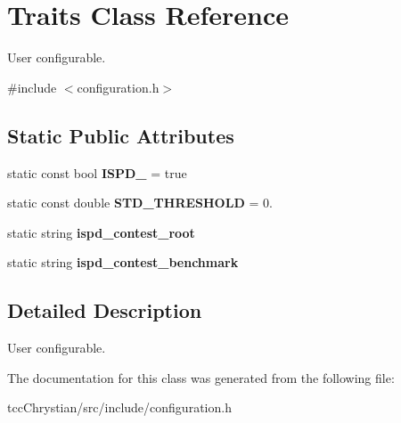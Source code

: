 \hypertarget{classTraits}{\section{Traits Class Reference}
\label{classTraits}
}


User configurable.  




{\ttfamily \#include $<$configuration.\-h$>$}

\subsection*{Static Public Attributes}
\begin{DoxyCompactItemize}
\item 
\hypertarget{classTraits_a6be4a9876454c3e6e139e7d213a74884}{static const bool {\bfseries I\-S\-P\-D\-\_} = true}\label{classTraits_a6be4a9876454c3e6e139e7d213a74884}

\item 
\hypertarget{classTraits_ab7f403f849da178fd4c1995084f3709b}{static const double {\bfseries S\-T\-D\-\_\-\-T\-H\-R\-E\-S\-H\-O\-L\-D} = 0.}\label{classTraits_ab7f403f849da178fd4c1995084f3709b}

\item 
\hypertarget{classTraits_a418b8b76f68ab0a74e58119f32330547}{static string {\bfseries ispd\-\_\-contest\-\_\-root}}\label{classTraits_a418b8b76f68ab0a74e58119f32330547}

\item 
\hypertarget{classTraits_af167fe41eea5cdd9e190a0807f39b3f4}{static string {\bfseries ispd\-\_\-contest\-\_\-benchmark}}\label{classTraits_af167fe41eea5cdd9e190a0807f39b3f4}

\end{DoxyCompactItemize}


\subsection{Detailed Description}
User configurable. 

The documentation for this class was generated from the following file\-:\begin{DoxyCompactItemize}
\item 
tcc\-Chrystian/src/include/configuration.\-h\end{DoxyCompactItemize}
